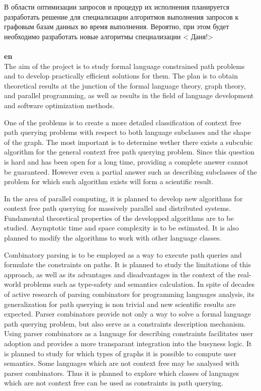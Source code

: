 \documentclass[12pt]{article}  %
\theoremstyle{remark}
\begin{document}
В области оптимизации запросов и процедур их исполнения планируется разработать решение для специализации алгоритмов выполнения запросов к графовым базам данных во время выполнения. Вероятно, при этом будет необходимо разработать новые алгоритмы специализации
{\huge< Даня!>}
\\
\\
\textbf{en}\\

The aim of the project is to study formal language constrained path problems and to develop practically efficient solutions for them.
The plan is to obtain theoretical results at the junction of the formal language theory, graph theory, and parallel programming, as well as results in the field of language development and software optimization methods.

One of the problems is to create a more detailed classification of context free path querying problems with respect to both language subclasses and the shape of the graph.
The most important is to determine wether there exists a subcubic algorithm for the general context free path querying problem.
Since this question is hard and has been open for a long time, providing a complete answer cannot be guaranteed.
However even a partial answer such as describing subclasses of the problem for which such algorithm exists will form a scientific result.

In the area of parallel computing, it is planned to develop new algorithms for context free path querying for massively parallel and distributed systems.
Fundamental theoretical properties of the developped algorithms are to be studied.
Asymptotic time and space complexity is to be estimated.
It is also planned to modify the algorithms to work with other language classes.

Combinatory parsing is to be employed as a way to execute path queries and formulate the constraints on paths.
It is planned to study the limitations of this approach, as well as its advantages and disadvantages in the context of the real-world problems such as type-safety and semantics calculation.
In spite of decades of active research of parsing combinators for programming languages analysis, its generalization for path querying is non trivial and new scientific results are expected.
Parser combinators provide not only a way to solve a formal language path querying problem, but also serve as a constraints description mechanism.
Using parser combinators as a language for describing constraints facilitates user adoption and provides a more transparant integration into the busyness logic.
It is planned to study for which types of graphs it is possible to compute user semantics.
Some languages which are not context free may be analysed with parser combinators.
Thus it is planned to explore which classes of languages which are not context free can be used as constraints in path querying.
\end{document}
